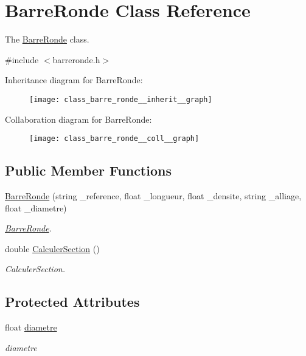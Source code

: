 \hypertarget{class_barre_ronde}{}\section{Barre\+Ronde Class Reference}
\label{class_barre_ronde}


The \hyperlink{class_barre_ronde}{Barre\+Ronde} class.  




{\ttfamily \#include $<$barreronde.\+h$>$}



Inheritance diagram for Barre\+Ronde\+:
\nopagebreak
\begin{figure}[H]
\begin{center}
\leavevmode
\texttt{[image: class\_barre\_ronde\_\_inherit\_\_graph]}
\end{center}
\end{figure}


Collaboration diagram for Barre\+Ronde\+:
\nopagebreak
\begin{figure}[H]
\begin{center}
\leavevmode
\texttt{[image: class\_barre\_ronde\_\_coll\_\_graph]}
\end{center}
\end{figure}
\subsection*{Public Member Functions}
\begin{DoxyCompactItemize}
\item 
\hyperlink{class_barre_ronde_a22d65bac5def297fe6f07b834e937649}{Barre\+Ronde} (string \+\_\+reference, float \+\_\+longueur, float \+\_\+densite, string \+\_\+alliage, float \+\_\+diametre)
\begin{DoxyCompactList}\small\item\em \hyperlink{class_barre_ronde}{Barre\+Ronde}. \end{DoxyCompactList}\item 
double \hyperlink{class_barre_ronde_adc6f65b51c7ca244fb29f2ed4b9a6f91}{Calculer\+Section} ()
\begin{DoxyCompactList}\small\item\em Calculer\+Section. \end{DoxyCompactList}\end{DoxyCompactItemize}
\subsection*{Protected Attributes}
\begin{DoxyCompactItemize}
\item 
float \hyperlink{class_barre_ronde_ac1df0f24c2bbbb4fdb9533fa94639e92}{diametre}
\begin{DoxyCompactList}\small\item\em diametre \end{DoxyCompactList}\end{DoxyCompactItemize}


